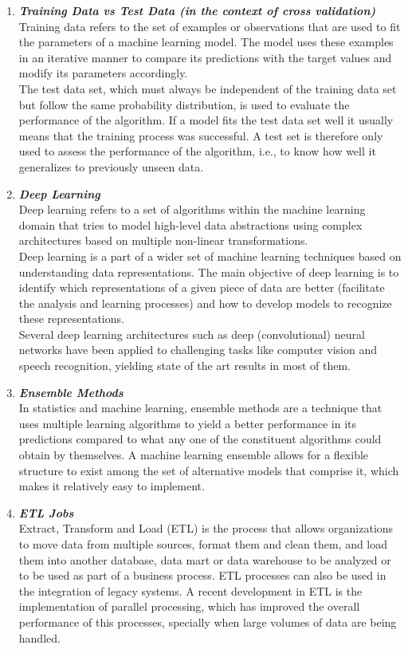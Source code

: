 \documentclass{article}
\begin{document}
\begin{enumerate}[label=(\alph*)]
\begin{enumerate}[label=\textbf{\arabic*.}]
            \item \textbf{\textit{Training Data vs Test Data (in the context of cross validation)}}\\
Training data refers to the set of examples or observations that are used to fit the parameters of a machine learning model. The model uses these examples in an iterative manner to compare its predictions with the target values and modify its parameters accordingly.\\
The test data set, which must always be independent of the training data set but follow the same probability distribution, is used to evaluate the performance of the algorithm. If a model fits the test data set well it usually means that the training process was successful. A test set is therefore only used to assess the performance of the algorithm, i.e., to know how well it generalizes to previously unseen data.
            
            \item \textbf{\textit{Deep Learning}}\\
Deep learning refers to a set of algorithms within the machine learning domain that tries to model high-level data abstractions using complex architectures based on multiple non-linear transformations.\\
Deep learning is a part of a wider set of machine learning techniques based on understanding data representations. The main objective of deep learning is to identify which representations of a given piece of data are better (facilitate the analysis and learning processes) and how to develop models to recognize these representations.\\
Several deep learning architectures such as deep (convolutional) neural networks have been applied to challenging tasks like computer vision and speech recognition, yielding state of the art results in most of them.
            
            \item \textbf{\textit{Ensemble Methods}}\\
In statistics and machine learning, ensemble methods are a technique that uses multiple learning algorithms to yield a better performance in its predictions compared to what any one of the constituent algorithms could obtain by themselves. A machine learning ensemble allows for a flexible structure to exist among the set of alternative models that comprise it, which makes it relatively easy to implement.
            
            \item \textbf{\textit{ETL Jobs}}\\
Extract, Transform and Load (ETL) is the process that allows organizations to move data from multiple sources, format them and clean them, and load them into another database, data mart or data warehouse to be analyzed or to be used as part of a business process. ETL processes can also be used in the integration of legacy systems. A recent development in ETL is the implementation of parallel processing, which has improved the overall performance of this processes, specially when large volumes of data are being handled.
            

\end{enumerate}
\end{enumerate}
\end{document}
